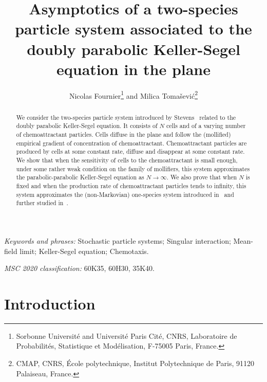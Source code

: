 \documentclass[11pt]{article}
\title{Asymptotics of a two-species particle system associated to the doubly parabolic Keller-Segel equation in the plane}
\author{Nicolas Fournier\footnote{Sorbonne Université and Université Paris Cité, CNRS, 
Laboratoire de Probabilités, Statistique et Modélisation, F-75005 Paris, France.}
\hskip2mm  and Milica Toma\v sevi\'c\footnote{CMAP, CNRS, École polytechnique, Institut Polytechnique de
Paris, 91120 Palaiseau, France.}}
\date{}
\newcommand{\1}{\mathbbm{1}}
\newcommand{\vip}{\vskip5pt}
\begin{document}
\maketitle

\begin{abstract}
 We consider the two-species particle system introduced by Stevens~\cite{Stevens} related to the doubly parabolic Keller-Segel equation.  It consists of $N$ cells and of a varying number of chemoattractant particles. Cells  diffuse in the plane and follow the (mollified) empirical gradient of concentration of chemoattractant. Chemoattractant particles are produced by  cells at some constant rate, diffuse and  disappear at some constant rate. We show that when the sensitivity of cells to the chemoattractant is small enough, under some rather weak condition on the family of mollifiers, this system  approximates the parabolic-parabolic Keller-Segel equation as $N\to \infty$. We also prove that when $N$ is fixed and when the production rate of chemoattractant particles tends to infinity, this system approximates the (non-Markovian) one-species system introduced in~\cite{Mi-De} and further studied in~\cite{FT1}.
\end{abstract}

\vip
\noindent\textit{Keywords and phrases:} Stochastic particle systems; Singular interaction; 
Mean-field limit; Keller-Segel equation; Chemotaxis.

\noindent\textit{MSC 2020 classification:} 60K35, 60H30, 35K40.


\section{Introduction}
\end{document}
